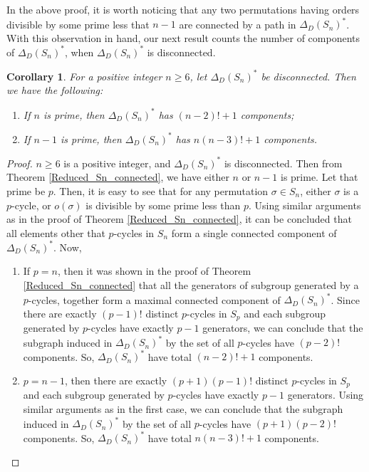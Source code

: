 \documentclass[12pt,a4paper]{article}
\newtheorem{corollary}[theorem]{Corollary}
\begin{document}
In the above proof, it is worth noticing that any two permutations having orders divisible by some prime less that $n-1$ are connected by a path in $\Delta_D(S_n)^*$. With this observation in hand, our next result counts the number of components of $\Delta_D(S_n)^*$, when $\Delta_D(S_n)^*$ is disconnected.

\begin{corollary}\label{Reduced_Sn_components}
 For a positive integer $n\geq 6$, let $\Delta_D(S_n)^*$ be disconnected. Then we have the following:
 \begin{enumerate}[\rm (i)]
     \item If $n$ is prime, then $\Delta_D(S_n)^*$ has $(n-2)!+1$ components;
     \item If $n-1$ is prime, then $\Delta_D(S_n)^*$ has $n(n-3)!+1$ components.
 \end{enumerate}
\end{corollary}

\begin{proof}
 $n\geq 6$ is a positive integer, and $\Delta_D(S_n)^*$ is disconnected. Then from Theorem \ref{Reduced_Sn_connected}, we have either $n$ or $n-1$ is prime. Let that prime be $p$. Then, it is easy to see that for any permutation $\sigma\in S_n$, either $\sigma$ is a $p$-cycle, or $o(\sigma)$ is divisible by some prime less than $p$. Using similar arguments as in the proof of Theorem \ref{Reduced_Sn_connected}, it can be concluded that all elements other that $p$-cycles in $S_n$ form a single connected component of $\Delta_D(S_n)^*$. Now,  
 \begin{enumerate}[\rm (i)]
     \item If $p=n$, then it was shown in the proof of Theorem \ref{Reduced_Sn_connected} that all the generators of subgroup generated by a $p$-cycles, together form a maximal connected component of $\Delta_D(S_n)^*$. Since there are exactly $(p-1)!$ distinct $p$-cycles in $S_p$ and each subgroup generated by $p$-cycles have exactly $p-1$ generators, we can conclude that the subgraph induced in $\Delta_D(S_n)^*$ by the set of all $p$-cycles have $(p-2)!$ components. So, $\Delta_D(S_n)^*$ have total $(n-2)!+1$ components.
     \item $p=n-1$, then there are exactly $(p+1)(p-1)!$ distinct $p$-cycles in $S_p$ and each subgroup generated by $p$-cycles have exactly $p-1$ generators. Using similar arguments as in the first case, we can conclude that the subgraph induced in $\Delta_D(S_n)^*$ by the set of all $p$-cycles have $(p+1)(p-2)!$ components. So, $\Delta_D(S_n)^*$ have total $n(n-3)!+1$ components.
 \end{enumerate}
\end{proof}
\end{document}
